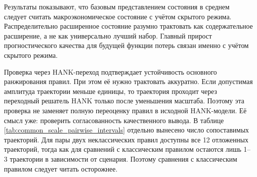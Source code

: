 \begin{table}[htbp]
\centering
\small
\caption{Попарные разности потерь при общей амплитуде траекторий}
\label{tab:common_scale_pairwise_intervals}

\end{table}

\begin{table}[htbp]
\centering
\small
\caption{Чувствительность проверки к общей амплитуде траекторий}
\label{tab:common_scale_sensitivity}

\end{table}

Результаты показывают, что базовым представлением состояния в среднем следует считать макроэкономическое состояние с учётом скрытого режима. Распределительно расширенное состояние разумно трактовать как содержательное расширение, а не как универсально лучший набор. Главный прирост прогностического качества для будущей функции потерь связан именно с учётом скрытого режима.

Проверка через HANK-переход подтверждает устойчивость основного ранжирования правил. При этом её нужно трактовать аккуратно. Если допустимая амплитуда траектории меньше единицы, то траектория проходит через переходный решатель HANK только после уменьшения масштаба. Поэтому эта проверка не заменяет полную переоценку правил в исходной HANK-модели. Её смысл уже: проверить согласованность качественного вывода. В таблице \ref{tab:common_scale_pairwise_intervals} отдельно вынесено число сопоставимых траекторий. Для пары двух неклассических правил доступны все 12 отложенных траекторий, тогда как для сравнений с классическим правилом остаются лишь 1--3 траектории в зависимости от сценария. Поэтому сравнения с классическим правилом следует читать осторожнее.
